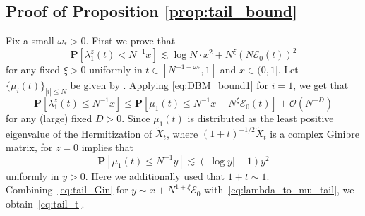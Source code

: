 \documentclass[10pt]{amsart}
\numberwithin{equation}{section}
\begin{document}
\subsection{Proof of Proposition \ref{prop:tail_bound}}\label{sec:tail_bound} Fix a small $\omega_*>0$. First we prove that
\begin{equation}
\mathbf{P}\left[\lambda_1^z(t) <N^{-1}x\right] \lesssim \log N\cdot x^2 + N^\xi (N\mathcal{E}_0(t))^2
\label{eq:tail_t}
\end{equation}
for any fixed $\xi>0$ uniformly in $t\in [N^{-1+\omega_*},1]$ and $x\in (0,1]$. Let $\{\mu_i(t)\}_{|i|\le N}$ be given by \cite[Proposition~4.6]{bourgade2024fluctuations}. Applying \eqref{eq:DBM_bound1} for $i=1$, we get that
\begin{equation}
\mathbf{P}\left[\lambda_1^z(t) \le N^{-1}x\right] \le \mathbf{P}\left[\mu_1(t)\le N^{-1}x + N^\xi \mathcal{E}_0(t) \right] + \mathcal{O}(N^{-D})
\label{eq:lambda_to_mu_tail}
\end{equation}
for any (large) fixed $D>0$. Since $\mu_1(t)$ is distributed as the least positive eigenvalue of the Hermitization of $\widetilde{X}_t$, where $(1+t)^{-1/2}\widetilde{X}_{t}$ is a complex Ginibre matrix, \cite[Corollary 2.4]{least_sing_val_Ginibre} for $z=0$ implies that
\begin{equation}
\mathbf{P}\left[\mu_1(t) \le N^{-1}y\right]\lesssim (|\log y|+1)y^2 
\label{eq:tail_Gin}
\end{equation}
uniformly in $y>0$. Here we additionally used that $1+t\sim 1$. Combining~\eqref{eq:tail_Gin} for $y\sim x + N^{1+\xi}\mathcal{E}_0$ with~\eqref{eq:lambda_to_mu_tail}, we obtain~\eqref{eq:tail_t}.
\end{document}
